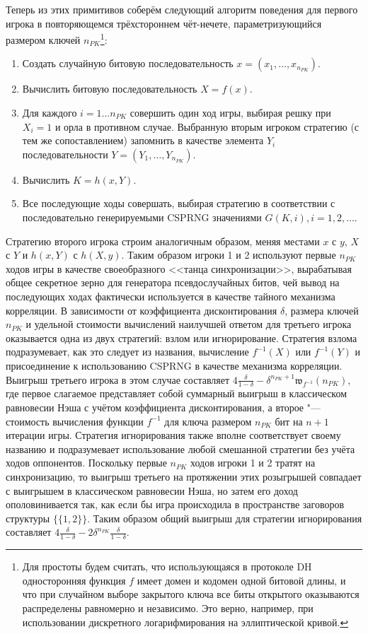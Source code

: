 Теперь из этих примитивов соберём следующий алгоритм поведения для первого игрока в повторяющемся трёхстороннем чёт-нечете, параметризующийся размером ключей $n_{PK}$\footnote{Для простоты будем считать, что использующаяся в протоколе DH односторонняя функция $f$ имеет домен и кодомен одной битовой длины, и что при случайном выборе закрытого ключа все биты открытого оказываются распределены равномерно и независимо. Это верно, например, при использовании дискретного логарифмирования на эллиптической кривой.}:
\begin{enumerate}
	\item Создать случайную битовую последовательность $x = (x_1, \ldots, x_{n_{PK}})$.
	\item Вычислить битовую последовательность $X = f(x)$.
	\item Для каждого $i = 1 \ldots n_{PK}$ совершить один ход игры, выбирая решку при $X_i = 1$ и орла в противном случае. Выбранную вторым игроком стратегию (с тем же сопоставлением) запомнить в качестве элемента $Y_i$ последовательности $Y = (Y_1, \ldots, Y_{n_{PK}})$.
	\item Вычислить $K = h(x, Y)$.
	\item Все последующие ходы совершать, выбирая стратегию в соответствии с последовательно генерируемыми CSPRNG значениями $G(K, i), i = 1, 2, \ldots$.
\end{enumerate}

Стратегию второго игрока строим аналогичным образом, меняя местами $x$ с $y$, $X$ с $Y$ и $h(x, Y)$ с $h(X, y)$. Таким образом игроки 1 и 2 используют первые $n_{PK}$ ходов игры в качестве своеобразного <<танца синхронизации>>, вырабатывая общее секретное зерно для генератора псевдослучайных битов, чей вывод на последующих ходах фактически используется в качестве тайного механизма корреляции. В зависимости от коэффициента дисконтирования $\delta$, размера ключей $n_{PK}$ и удельной стоимости вычислений наилучшей ответом для третьего игрока оказывается одна из двух стратегий: взлом или игнорирование. Стратегия взлома подразумевает, как это следует из названия, вычисление $f^{-1}(X)$ или $f^{-1}(Y)$ и присоединение к использованию CSPRNG в качестве механизма корреляции. Выигрыш третьего игрока в этом случае составляет $4 \frac{\delta}{1-\delta} - \delta^{n_{PK} + 1} \mathfrak{w}_{f^{-1}}(n_{PK})$, где первое слагаемое представляет собой суммарный выигрыш в классическом равновесии Нэша с учётом коэффициента дисконтирования, а второе "--- стоимость вычисления функции $f^{-1}$ для ключа размером $n_{PK}$ бит на $n + 1$ итерации игры. Стратегия игнорирования также вполне соответствует своему названию и подразумевает использование любой смешанной стратегии без учёта ходов оппонентов. Поскольку первые $n_{PK}$ ходов игроки 1 и 2 тратят на синхронизацию, то выигрыш третьего на протяжении этих розыгрышей совпадает с выигрышем в классическом равновесии Нэша, но затем его доход ополовинивается так, как если бы игра происходила в пространстве заговоров структуры $\{\{1, 2\}\}$. Таким образом общий выигрыш для стратегии игнорирования составляет $4 \frac{\delta}{1-\delta} - 2 \delta^{n_{PK}} \frac{\delta}{1-\delta}$.

